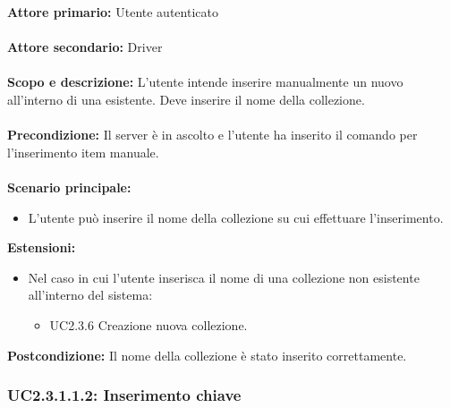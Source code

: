 \documentclass{scalatekids-article}
\begin{document}
\textbf{Attore primario:} Utente autenticato\\ \\
\textbf{Attore secondario:} Driver\\ \\
\textbf{Scopo e descrizione:} L'utente intende inserire manualmente un nuovo  all'interno di una  esistente. Deve inserire il nome della collezione.\\ \\
\textbf{Precondizione:} Il server è in ascolto e l'utente ha inserito il comando per l'inserimento item manuale.\\ \\
\textbf{Scenario principale:}
\begin{itemize}
  \item L'utente può inserire il nome della collezione su cui effettuare l'inserimento.
\end{itemize}
\textbf{Estensioni:}
\begin{itemize}
  \item Nel caso in cui l'utente inserisca il nome di una collezione non esistente all'interno del sistema:
  \begin{itemize}
    \item UC2.3.6 Creazione nuova collezione. %
  \end{itemize}
\end{itemize}
\textbf{Postcondizione:} Il nome della collezione è stato inserito correttamente.

\subsubsection{UC2.3.1.1.2: Inserimento chiave}
\end{document}
